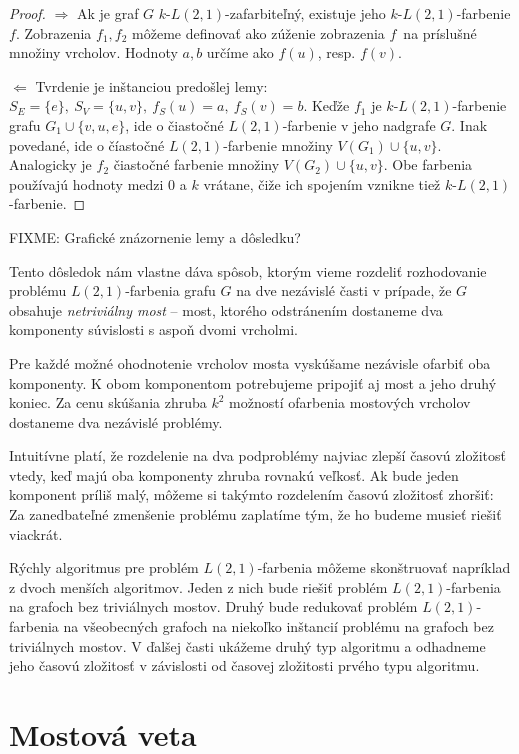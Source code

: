 \begin{proof}
    $\boxed{\Rightarrow}$
        Ak je graf $G$ $k$-$L(2,1)$-zafarbiteľný, existuje jeho $k$-$L(2,1)$-farbenie $f$. Zobrazenia $f_1, f_2$ môžeme
        definovať ako zúženie zobrazenia $f$ na príslušné množiny vrcholov. Hodnoty $a, b$ určíme ako $f(u)$, resp. $f(v)$.

    $\boxed{\Leftarrow}$
        Tvrdenie je inštanciou predošlej lemy: $S_E = \{e\},\ S_V = \{u,v\},\ f_S(u) = a,\ f_S(v) = b$. Keďže $f_1$
        je $k$-$L(2,1)$-farbenie grafu $G_1 \cup \{v, u, e\}$, ide o čiastočné $L(2,1)$-farbenie v jeho nadgrafe $G$.
        Inak povedané, ide o číastočné $L(2,1)$-farbenie množiny $V(G_1) \cup \{u, v\}$. Analogicky je $f_2$ čiastočné
        farbenie množiny $V(G_2) \cup \{u,v\}$. Obe farbenia používajú hodnoty medzi $0$ a $k$ vrátane, čiže ich
        spojením vznikne tiež $k$-$L(2,1)$-farbenie.
\end{proof}

FIXME: Grafické znázornenie lemy a dôsledku? %

Tento dôsledok nám vlastne dáva spôsob, ktorým vieme rozdeliť rozhodovanie
problému $L(2,1)$-farbenia grafu $G$ na dve nezávislé časti v prípade,
že $G$ obsahuje \emph{netriviálny most} -- most, ktorého odstránením dostaneme
dva komponenty súvislosti s aspoň dvomi vrcholmi.

Pre každé možné ohodnotenie vrcholov mosta vyskúšame nezávisle ofarbiť oba
komponenty. K obom komponentom potrebujeme pripojiť aj most a jeho druhý koniec. Za cenu
skúšania zhruba $k^2$ možností ofarbenia mostových vrcholov dostaneme dva nezávislé
problémy.

Intuitívne platí, že rozdelenie na dva podproblémy
najviac zlepší časovú zložitosť vtedy, keď majú oba komponenty zhruba rovnakú veľkosť.
Ak bude jeden komponent príliš malý, môžeme si takýmto rozdelením časovú zložitosť zhoršiť:
Za zanedbateľné zmenšenie problému zaplatíme tým, že ho budeme musieť riešiť viackrát.

Rýchly algoritmus pre problém $L(2,1)$-farbenia môžeme skonštruovať napríklad z dvoch menších
algoritmov. Jeden z nich bude riešiť problém $L(2,1)$-farbenia na grafoch bez triviálnych mostov.
Druhý bude redukovať problém $L(2,1)$-farbenia na všeobecných grafoch na niekoľko inštancií
problému na grafoch bez triviálnych mostov. V ďalšej časti ukážeme druhý typ algoritmu a odhadneme
jeho časovú zložitosť v závislosti od časovej zložitosti prvého typu algoritmu.

\section{Mostová veta}

